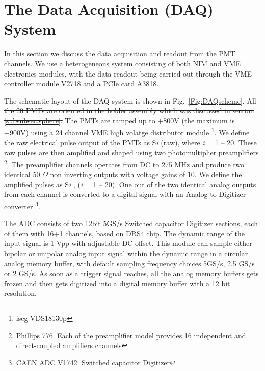 \section{The Data Acquisition (DAQ) System }
\label{sec:DAQ}

{}

 In this section we discuss the data acquisition and readout from the PMT 
channels. We use a heterogeneous system consisting of both 
NIM and VME electronics modules, with the data readout being carried out through the VME controller module V2718 and a PCIe card A3818. 

The schematic layout of the DAQ system is shown in Fig.~{\ref{Fig:DAQscheme}}. \sout{All the 20 PMTs are oriented in the holder assembly which was discussed in section \ref{subsubsec:sphere}.} The PMTs are ramped up to +800V (the maximum is +900V) using a 24 channel VME high volatge distributor module \footnote{iseg VDS18130p}. We define the raw electrical pulse output of the PMTs as S{\it i} (raw), where {\it i} = 1 -- 20. 
These raw pulses are then amplified and shaped using two photomultiplier preamplifiers \footnote{Phillips 776. Each of the preamplifier model provides 16 independent and direct-coupled amplifiers channels}. The preamplifier channels operates from DC to 275 MHz and produce two identical 50 $\Omega$ non inverting outputs with voltage gains of 10.  We define the amplified pulses as S{\it i} , ({\it i} = 1 -- 20). One out of the two identical analog outputs from each channel is converted to a digital signal with an Analog to Digitizer converter \footnote{CAEN ADC V1742: Switched capacitor Digitizer}. 

The ADC consists of two 12bit 5GS/s Switched capacitor Digitizer sections, 
each of them with 16+1 channels, based on DRS4 chip. The dynamic range of the input signal is 1 Vpp with adjustable DC offset. This module can sample either bipolar or unipolar analog input signal within the dynamic range in a circular 
analog memory buffer, with default sampling frequency choices 5GS/s, 2.5 GS/s 
or 2 GS/s. As soon as a trigger signal reaches, all the analog memory 
buffers gets frozen and then gets digitized into a digital memory buffer 
with a 12 bit resolution. 

